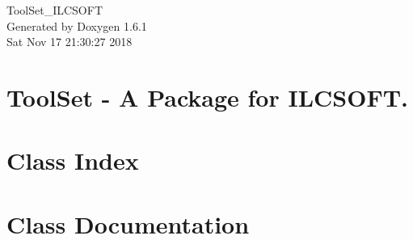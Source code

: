 \documentclass[a4paper]{book}
\begin{document}
\hypersetup{pageanchor=false}
\begin{titlepage}
\vspace*{7cm}
\begin{center}
{\Large ToolSet\_\-ILCSOFT }\\
\vspace*{1cm}
{\large Generated by Doxygen 1.6.1}\\
\vspace*{0.5cm}
{\small Sat Nov 17 21:30:27 2018}\\
\end{center}
\end{titlepage}
\clearemptydoublepage
{}
\tableofcontents
\clearemptydoublepage
{}
\hypersetup{pageanchor=true}
\chapter{ToolSet -\/ A Package for ILCSOFT.}
\label{index}\hypertarget{index}{}
\chapter{Class Index}

\chapter{Class Documentation}







\printindex
\end{document}
